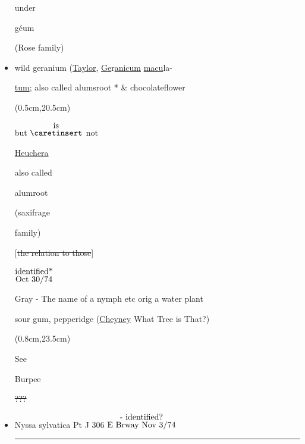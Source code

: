 \documentclass[a4paper,10pt]{article}
\begin{document}
\begin{flushleft}
\begin{itemize}
\begin{minipage}{0.7in}
    under\par
    g\'eum\par
    (Rose family)
\end{minipage}%
\color{blue}
\normalsize
\item wild geranium (\ul{Taylor}, \ul{Ge}r\ul{anicum} \ul{macu}la-\par
\ul{tum}; also called alumsroot
\color{red}
* 
\color{blue}
\& chocolateflower\par
{}
\color{red}
\begin{textblock*}{3.22in}(0.5cm,20.5cm)%
    \small
    \begin{minipage}{3.22in} 
        \color{red}
        but $\stackrel{\hbox{is}}{\hbox{$\caretinsert$}}$ not\par
        \ul{Heuchera}\par
        also called\par
         alumroot\par
        (saxifrage\par
        family)
        \normalsize
  \end{minipage}%
  \end{textblock*}%
\color{blue}
[\st{the relation to those}]
{$\stackrel{\hbox{identified*}}{\hbox{Oct 30/74}}$}\par
[*neighbor called it wild strawberry, but\par 
no berry]\par
Gray - The name of a nymph etc orig a water plant\par 
sour gum, pepperidge \color{red} (\ul{Cheyney} What Tree is That?)
\begin{textblock*}{2in}(0.8cm,23.5cm)%
    \small
    \begin{minipage}{2in} 
        \color{red}
        See\par
        Burpee\par
        \sout{???}\par
        \normalsize
  \end{minipage}%
  \end{textblock*}%
\color{blue}
\item Nyssa sylvatica Pt J 306 {$\stackrel{\hbox{- identified?}}{\hbox{E Brway Nov 3/74}}$}
\begin{adjustwidth}{-0.5in}{-0.5in}
    \rule{4.5in}{0.005in}  
\end{adjustwidth}



\end{itemize}
\end{flushleft}
\end{document}
